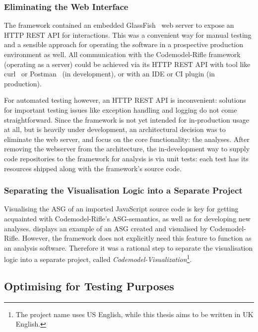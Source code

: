 \subsubsection{Eliminating the Web Interface}

The framework contained an embedded GlassFish~\cite{glassfish-website} web server to expose an HTTP REST API for interactions. This was a convenient way for manual testing and a sensible approach for operating the software in a prospective production environment as well. All communication with the Codemodel-Rifle framework (operating as a server) could be achieved via its HTTP REST API with tool like curl~\cite{curl-website} or Postman~\cite{postman-website} (in development), or with an IDE or CI plugin (in production).

For automated testing however, an HTTP REST API is inconvenient: solutions for important testing issues like exception handling and logging do not come straightforward. Since the framework is not yet intended for in-production usage at all, but is heavily under development, an architectural decision was to eliminate the web server, and focus on the core functionality: the analyses. After removing the webserver from the architecture, the in-development way to supply code repositories to the framework for analysis is via unit tests: each test has its resources shipped along with the framework's source code.


\subsubsection{Separating the Visualisation Logic into a Separate Project}

Visualising the ASG of an imported JavaScript source code is key for getting acquainted with Codemodel-Rifle's ASG-semantics, as well as for developing new analyses.  displays an example of an ASG created and visualised by Codemodel-Rifle. However, the framework does not explicitly need this feature to function as an analysis software. Therefore it was a rational step to separate the visualisation logic into a separate project, called \emph{Codemodel-Visualization}\footnote{The project name uses US English, while this thesis aims to be written in UK English.}.


\subsection{Optimising for Testing Purposes}

